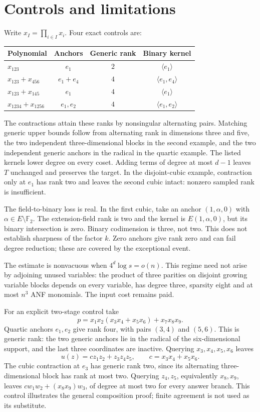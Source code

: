 \documentclass[11pt]{article}
\theoremstyle{remark}\newtheorem{remark}[theorem]{Remark}
\newcommand{\F}{\mathbb F}
\begin{document}
\section{Controls and limitations}
Write $x_I=\prod_{i\in I}x_i$. Four exact controls are:
\begin{center}
\begin{tabular}{lccc}
\hline
Polynomial & Anchors & Generic rank & Binary kernel\\
\hline
$x_{123}$ & $e_1$ & $2$ & $\langle e_1\rangle$\\
$x_{123}+x_{456}$ & $e_1+e_4$ & $4$ & $\langle e_1,e_4\rangle$\\
$x_{123}+x_{145}$ & $e_1$ & $4$ & $\langle e_1\rangle$\\
$x_{1234}+x_{1256}$ & $e_1,e_2$ & $4$ & $\langle e_1,e_2\rangle$\\
\hline
\end{tabular}
\end{center}
The contractions attain these ranks by nonsingular alternating pairs.
Matching generic upper bounds follow from alternating rank in dimensions
three and five, the two independent three-dimensional blocks in the second
example, and the two independent generic anchors in the radical in the
quartic example. The listed kernels lower degree on every coset.
Adding terms of degree at most $d-1$ leaves $T$ unchanged and preserves the
target. In the disjoint-cubic example, contraction only at $e_1$ has rank
two and leaves the second cubic intact: nonzero sampled rank is insufficient.

The field-to-binary loss is real. In the first cubic, take an anchor
$(1,\alpha,0)$ with $\alpha\in E\setminus\F_2$.
The extension-field rank is two and the kernel is $E(1,\alpha,0)$, but its binary intersection is zero. Binary codimension is three, not two. This does not establish sharpness of the factor $k$.
Zero anchors give rank zero and can fail degree reduction; these are covered by the exceptional event.

The estimate is nonvacuous when
$4^d\log s=o(n)$.
This regime need not arise by adjoining unused variables: the product of three parities on disjoint growing variable blocks depends on every variable, has degree three, sparsity eight and at most $n^3$ ANF monomials.
The input cost remains paid.

For an explicit two-stage control take
\[
 p=x_1x_2(x_3x_4+x_5x_6)+x_7x_8x_9.
\]
Quartic anchors $e_1,e_2$ give rank four, with pairs $(3,4)$ and $(5,6)$. This is generic rank: the two generic anchors lie in the radical of the six-dimensional support, and the last three coordinates are inactive. Querying $x_3,x_4,x_5,x_6$ leaves
\[
 u(z)=c z_1z_2+z_3z_4z_5,\qquad c=x_3x_4+x_5x_6.
\]
The cubic contraction at $e_3$ has generic rank two, since its alternating three-dimensional block has rank at most two. Querying $z_4,z_5$, equivalently $x_8,x_9$, leaves $c w_1w_2+(x_8x_9)w_3$, of degree at most two for every answer branch. This control illustrates the general composition proof; finite agreement is not used as its substitute.
\end{document}
